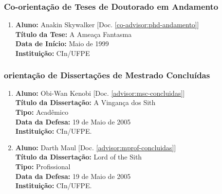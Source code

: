 \documentclass[a4paper,oneside,12pt]{article}
\begin{document}

\subsubsection{Co-orientação de Teses de Doutorado em Andamento}
\vspace{0.3cm}

\begin{enumerate}
\renewcommand{\labelenumi}{{\large\bfseries\arabic{enumi}.}}

\item       \textbf{Aluno:} Anakin Skywalker [Doc. \ref{co-advisor:phd-andamento}]\\
            \textbf{Título da Tese:} A Ameaça Fantasma \\
            \textbf{Data de Início:} Maio de 1999 \\
            \textbf{Instituição:} CIn/UFPE

\end{enumerate}


\subsubsection{orientação de Dissertações de Mestrado Concluídas}
\vspace{0.3cm}

\begin{enumerate}
\renewcommand{\labelenumi}{{\large\bfseries\arabic{enumi}.}}

\item       \textbf{Aluno:}  Obi-Wan Kenobi [Doc. \ref{advisor:msc-concluidas}] \\
            \textbf{Título da Dissertação:} A Vingança dos Sith\\
            \textbf{Tipo:} Acadêmico \\%
            \textbf{Data da Defesa:} 19 de Maio de 2005\\
            \textbf{Instituição:} CIn/UFPE.

\item       \textbf{Aluno:} Darth Maul [Doc. \ref{advisor:mprof-concluidas}] \\
            \textbf{Título da Dissertação:} Lord of the Sith\\
            \textbf{Tipo:} Profissional\\
            \textbf{Data da Defesa:} 19 de Maio de 2005\\
            \textbf{Instituição:} CIn/UFPE.

\end{enumerate}
\end{document}
